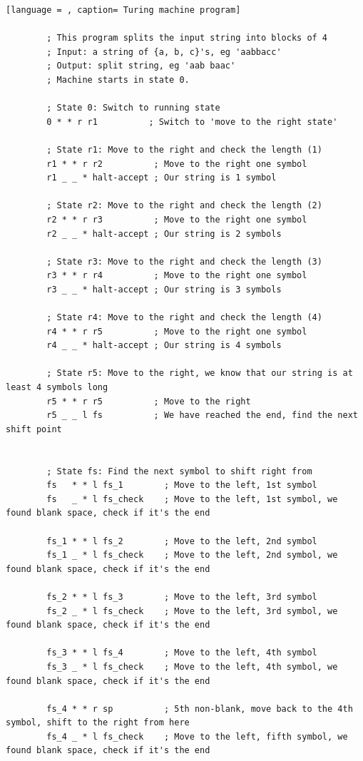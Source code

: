 \documentclass[12pt, a4paper]{report}
\begin{document}
\lstset{style=mystyle}

	\begin{lstlisting}[language = , caption= Turing machine program] 
	
		; This program splits the input string into blocks of 4
		; Input: a string of {a, b, c}'s, eg 'aabbacc'
		; Output: split string, eg 'aab baac'
		; Machine starts in state 0.

		; State 0: Switch to running state
		0 * * r r1          ; Switch to 'move to the right state'

		; State r1: Move to the right and check the length (1)
		r1 * * r r2          ; Move to the right one symbol
		r1 _ _ * halt-accept ; Our string is 1 symbol

		; State r2: Move to the right and check the length (2)
		r2 * * r r3          ; Move to the right one symbol
		r2 _ _ * halt-accept ; Our string is 2 symbols

		; State r3: Move to the right and check the length (3)
		r3 * * r r4          ; Move to the right one symbol
		r3 _ _ * halt-accept ; Our string is 3 symbols

		; State r4: Move to the right and check the length (4)
		r4 * * r r5          ; Move to the right one symbol
		r4 _ _ * halt-accept ; Our string is 4 symbols

		; State r5: Move to the right, we know that our string is at least 4 symbols long
		r5 * * r r5          ; Move to the right
		r5 _ _ l fs          ; We have reached the end, find the next shift point


		; State fs: Find the next symbol to shift right from
		fs   * * l fs_1        ; Move to the left, 1st symbol
		fs   _ * l fs_check    ; Move to the left, 1st symbol, we found blank space, check if it's the end

		fs_1 * * l fs_2        ; Move to the left, 2nd symbol
		fs_1 _ * l fs_check    ; Move to the left, 2nd symbol, we found blank space, check if it's the end

		fs_2 * * l fs_3        ; Move to the left, 3rd symbol
		fs_2 _ * l fs_check    ; Move to the left, 3rd symbol, we found blank space, check if it's the end

		fs_3 * * l fs_4        ; Move to the left, 4th symbol
		fs_3 _ * l fs_check    ; Move to the left, 4th symbol, we found blank space, check if it's the end

		fs_4 * * r sp          ; 5th non-blank, move back to the 4th symbol, shift to the right from here
		fs_4 _ * l fs_check    ; Move to the left, fifth symbol, we found blank space, check if it's the end


\end{lstlisting}
\end{document}
